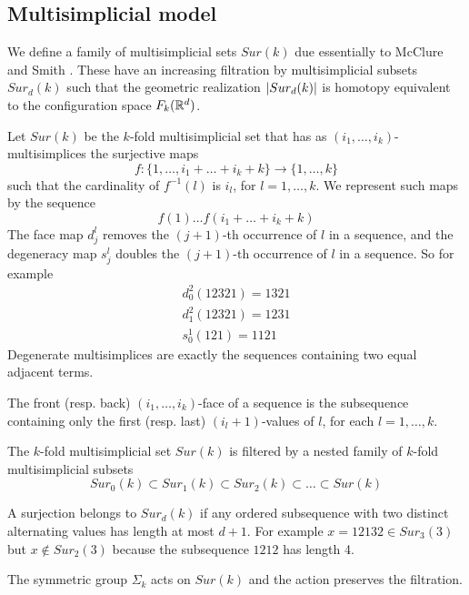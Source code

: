 \subsection{Multisimplicial model} \label{ss:multisimplicial model}

We define a family of multisimplicial sets $Sur(k)$ due essentially to McClure and Smith \cite{MS}.
These have an increasing filtration by multisimplicial subsets $Sur_d(k)$ such that the geometric realization $\lvert Sur_d(k)\rvert$ is homotopy equivalent to the configuration space
$F_k(\mathbb{R}^d)$.


\begin{definition}
	Let $Sur(k)$ be the $k$-fold multisimplicial set that has
	as $(i_1,\dots,i_k)$-multisimplices
	the surjective maps
	$$f:\{1,\dots,i_1+\dots+i_k+k\} \to \{1,\dots,k\}$$
	such that the cardinality of $f^{-1}(l)$ is $i_l$, for $l=1,\dots,k$.
	We represent such maps by the sequence
	$$f(1) \dots f(i_1+\dots+i_k+k)$$
	The face map
	$d^l_j$ removes the $(j+1)$-th occurrence of $l$ in a sequence, and the degeneracy map
	$s^l_j$ doubles the $(j+1)$-th occurrence of $l$ in a sequence.
	So for example
	\begin{align*}
		d^2_0(12321)=1321 \\ d^2_1(12321)=1231 \\ s^1_0(121)=1121
	\end{align*}
	Degenerate multisimplices are exactly the sequences containing two equal adjacent terms.

	The front (resp. back) $(i_1,\dots,i_k)$-face of a sequence is the subsequence containing only the first (resp. last)
	$(i_l+1)$-values of $l$, for each
	$l=1,\dots,k$.
\end{definition}

The $k$-fold multisimplicial set $Sur(k)$ is filtered
by a nested family of $k$-fold multisimplicial subsets
$$Sur_0(k) \subset Sur_1(k) \subset Sur_2(k) \subset \dots \subset Sur(k)$$

A surjection belongs to $Sur_d(k)$
if any ordered subsequence with two distinct alternating values has length at most $d+1$.
For example $x=12132 \in Sur_3(3)$ but $x \notin Sur_2(3)$ because the subsequence $1212$ has length 4.

The symmetric group $\Sigma_k$ acts on $Sur(k)$ and the action preserves the filtration.

